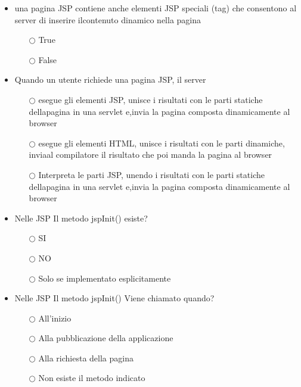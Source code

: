 \documentclass[10pt,twocolumn]{article}
\begin{document}
\begin{itemize}
    \item una pagina JSP contiene anche elementi JSP speciali (tag) che consentono al server di inserire ilcontenuto dinamico nella pagina
          \begin{itemize}
              \item[$\bigcirc$] True
              \item[$\bigcirc$] False
          \end{itemize}
\end{itemize}
\begin{itemize}
    \item Quando un utente richiede una pagina JSP, il server
          \begin{itemize}
              \item[$\bigcirc$] esegue gli elementi JSP, unisce i risultati con le parti statiche dellapagina in una servlet e,invia la pagina composta dinamicamente al browser
              \item[$\bigcirc$] esegue gli elementi HTML, unisce i risultati con le parti dinamiche, inviaal compilatore il risultato che poi manda la pagina al browser
              \item[$\bigcirc$] Interpreta le parti JSP, unendo i risultati con le parti statiche dellapagina in una servlet e,invia la pagina composta dinamicamente al browser
          \end{itemize}
\end{itemize}
\begin{itemize}
    \item Nelle JSP Il metodo jspInit() esiste?
          \begin{itemize}
              \item[$\bigcirc$] SI
              \item[$\bigcirc$] NO
              \item[$\bigcirc$] Solo se implementato esplicitamente
          \end{itemize}
\end{itemize}
\begin{itemize}
    \item Nelle JSP Il metodo jspInit() Viene chiamato quando?
          \begin{itemize}
              \item[$\bigcirc$] All'inizio
              \item[$\bigcirc$] Alla pubblicazione della applicazione
              \item[$\bigcirc$] Alla richiesta della pagina
              \item[$\bigcirc$] Non esiste il metodo indicato
          \end{itemize}
\end{itemize}
\end{document}
